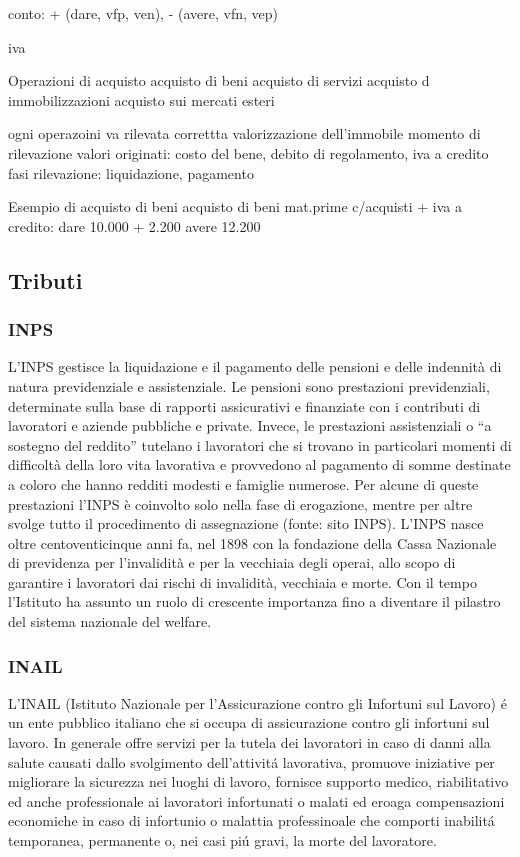 \documentclass{article}
\begin{document}
conto: + (dare, vfp, ven), - (avere, vfn, vep)

iva

Operazioni di acquisto
acquisto di beni
acquisto di servizi
acquisto d immobilizzazioni
acquisto sui mercati esteri

ogni operazoini va rilevata
correttta valorizzazione dell'immobile
momento di rilevazione
valori originati: costo del bene, debito di regolamento, iva a credito
fasi rilevazione: liquidazione, pagamento

Esempio di acquisto di beni
acquisto di beni
mat.prime c/acquisti +  iva a credito: dare 10.000 + 2.200
avere 12.200



\subsection{Tributi}

\subsubsection{INPS}
L’INPS gestisce la liquidazione e il pagamento delle pensioni e delle indennità di natura previdenziale e assistenziale. Le pensioni sono prestazioni previdenziali, determinate sulla base di rapporti assicurativi e finanziate con i contributi di lavoratori e aziende pubbliche e private. Invece, le prestazioni assistenziali o “a sostegno del reddito” tutelano i lavoratori che si trovano in particolari momenti di difficoltà della loro vita lavorativa e provvedono al pagamento di somme destinate a coloro che hanno redditi modesti e famiglie numerose. Per alcune di queste prestazioni l’INPS è coinvolto solo nella fase di erogazione, mentre per altre svolge tutto il procedimento di assegnazione (fonte: sito INPS). L’INPS nasce oltre centoventicinque anni fa, nel 1898 con la fondazione della Cassa Nazionale di previdenza per l'invalidità e per la vecchiaia degli operai, allo scopo di garantire i lavoratori dai rischi di invalidità, vecchiaia e morte. Con il tempo l’Istituto ha assunto un ruolo di crescente importanza fino a diventare il pilastro del sistema nazionale del welfare.

\subsubsection{INAIL}
L'INAIL (Istituto Nazionale per l'Assicurazione contro gli Infortuni sul Lavoro) \'e un ente pubblico italiano che si occupa di assicurazione contro gli infortuni sul lavoro.
In generale offre servizi per la tutela dei lavoratori in caso di danni alla salute causati dallo svolgimento dell'attivit\'a lavorativa, promuove iniziative per migliorare la sicurezza nei luoghi di lavoro, 
fornisce supporto medico, riabilitativo ed anche professionale ai lavoratori infortunati o malati ed eroaga compensazioni economiche in caso di infortunio o malattia professinoale che comporti inabilit\'a temporanea, permanente o, nei casi pi\'u gravi, la morte del lavoratore.
\end{document}
